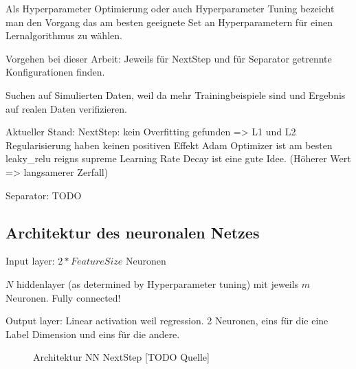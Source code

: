 Als Hyperparameter Optimierung oder auch Hyperparameter Tuning bezeicht man den Vorgang das am besten geeignete Set an 
Hyperparametern für einen Lernalgorithmus zu wählen.


Vorgehen bei dieser Arbeit: Jeweils für NextStep und für Separator getrennte Konfigurationen finden.

Suchen auf Simulierten Daten, weil da mehr Trainingbeispiele sind und Ergebnis auf realen Daten verifizieren.



Aktueller Stand:
NextStep: kein Overfitting gefunden => L1 und L2 Regularisierung haben keinen positiven Effekt
Adam Optimizer ist am besten
leaky\_relu reigns supreme
Learning Rate Decay ist eine gute Idee. (Höherer Wert => langsamerer Zerfall)

Separator: TODO

\subsection{Architektur des neuronalen Netzes}

Input layer: \(2 * FeatureSize\) Neuronen

\(N\) hiddenlayer (as determined by Hyperparameter tuning) mit jeweils \(m\) Neuronen.
Fully connected!

Output layer:
Linear activation weil regression.
2 Neuronen, eins für die eine Label Dimension und eins für die andere.

\begin{figure}
	\caption{Architektur NN NextStep [TODO Quelle]}
	\label{fig:netArchitecture}
\end{figure}
